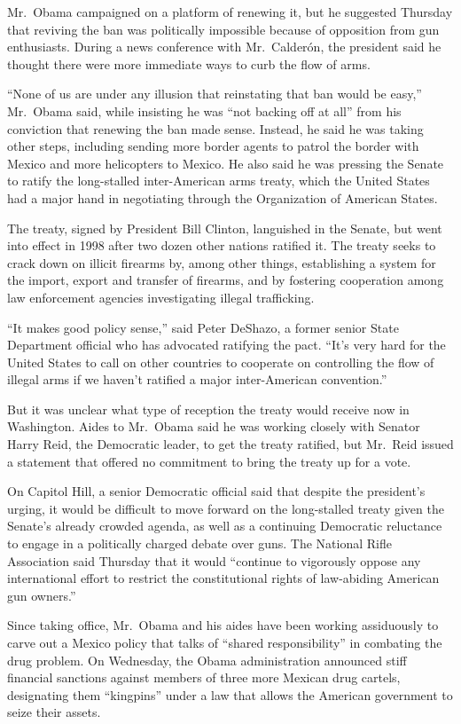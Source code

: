 \documentclass[12pt,a4paper,onecolumn]{article}
\begin{document}
Mr.~Obama campaigned on a platform of renewing it, but he suggested Thursday that reviving the ban
was politically impossible because of opposition from gun enthusiasts. During a news conference with
Mr.~Calderón, the president said he thought there were more immediate ways to curb the flow of arms.

``None of us are under any illusion that reinstating that ban would be easy,'' Mr.~Obama said, while
insisting he was ``not backing off at all'' from his conviction that renewing the ban made sense.
Instead, he said he was taking other steps, including sending more border agents to patrol the
border with Mexico and more helicopters to Mexico. He also said he was pressing the Senate to ratify
the long-stalled inter-American arms treaty, which the United States had a major hand in negotiating
through the Organization of American States.

The treaty, signed by President Bill Clinton, languished in the Senate, but went into effect in 1998
after two dozen other nations ratified it. The treaty seeks to crack down on illicit firearms by,
among other things, establishing a system for the import, export and transfer of firearms, and by
fostering cooperation among law enforcement agencies investigating illegal trafficking.

``It makes good policy sense,'' said Peter DeShazo, a former senior State Department official who
has advocated ratifying the pact. ``It's very hard for the United States to call on other countries
to cooperate on controlling the flow of illegal arms if we haven't ratified a major inter-American
convention.''

But it was unclear what type of reception the treaty would receive now in Washington. Aides to
Mr.~Obama said he was working closely with Senator Harry Reid, the Democratic leader, to get the
treaty ratified, but Mr.~Reid issued a statement that offered no commitment to bring the treaty up
for a vote.

On Capitol Hill, a senior Democratic official said that despite the president's urging, it would be
difficult to move forward on the long-stalled treaty given the Senate's already crowded agenda, as
well as a continuing Democratic reluctance to engage in a politically charged debate over guns. The
National Rifle Association said Thursday that it would ``continue to vigorously oppose any
international effort to restrict the constitutional rights of law-abiding American gun owners.''

Since taking office, Mr.~Obama and his aides have been working assiduously to carve out a Mexico
policy that talks of ``shared responsibility'' in combating the drug problem. On Wednesday, the
Obama administration announced stiff financial sanctions against members of three more Mexican drug
cartels, designating them ``kingpins'' under a law that allows the American government to seize
their assets.
\end{document}
